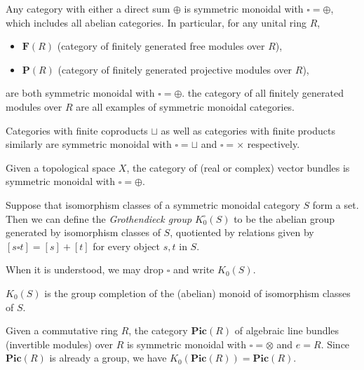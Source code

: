 \begin{example}
Any category with either a direct sum $\oplus$ is symmetric monoidal with $\square = \oplus$,
which includes all abelian categories. In particular, for any unital ring $R$, 
\begin{itemize}
  \item 
$\mathbf F(R)$ (category of finitely generated free modules over $R$),
\item 
$\mathbf P(R)$ (category of finitely generated projective modules over $R$),
\end{itemize}
are both symmetric monoidal with $\square = \oplus$.
the category of all finitely generated modules over $R$ are all examples of symmetric monoidal categories.

Categories with finite coproducts $\sqcup$ as well as categories with finite products similarly 
are symmetric monoidal with $\square = \sqcup$ and $\square = \times$ respectively.
\end{example}

\begin{example}
Given a topological space $X$, the category of (real or complex) vector bundles is symmetric monoidal with $\square = \oplus$.
\end{example}

\begin{definition}
Suppose that isomorphism classes of a symmetric monoidal category $S$ form a set.
Then we can define the \emph{Grothendieck group} $K_0^{\square}(S)$ to be the abelian group
generated by isomorphism classes of $S$, quotiented by relations given by
$[s \square t] = [s] + [t]$ for every object $s, t$ in $S$.
\end{definition}

When it is understood, we may drop $\square$ and write $K_0(S)$.

\begin{proposition}
$K_0(S)$ is the group completion of the (abelian) monoid of isomorphism classes of $S$.
\end{proposition}

\begin{example}
Given a commutative ring $R$, the category $\mathbf {Pic}(R)$ of algebraic line bundles (invertible modules) over $R$
is symmetric monoidal with $\square = \otimes$ and $e = R$. Since $\mathbf {Pic}(R)$ is already a group, 
we have $K_0(\mathbf{Pic}(R)) = \mathbf{Pic}(R)$.
\end{example}

